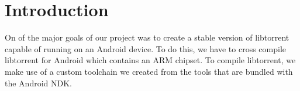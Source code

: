 \section{Introduction}
	On of the major goals of our project was to create a stable version of libtorrent capable of running on an Android device. To do this, we have to cross compile libtorrent for  Android which contains an ARM chipset. To compile libtorrent, we make use of a custom toolchain we created from the tools that are bundled with the Android NDK.
